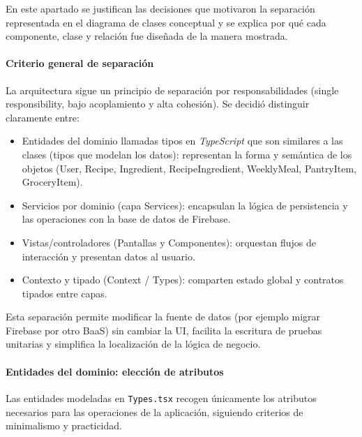 \documentclass[twoside, openright, 11pt]{report}
\begin{document}
		En este apartado se justifican las decisiones que motivaron la separación representada en el diagrama de clases conceptual y se explica por qué cada componente, clase y relación fue diseñada de la manera mostrada.
		
		\paragraph{Criterio general de separación}
		La arquitectura sigue un principio de separación por responsabilidades (single responsibility, bajo acoplamiento y alta cohesión). Se decidió distinguir claramente entre:
		\begin{itemize}
			\item Entidades del dominio llamadas tipos en \textit{TypeScript} que son similares a las clases (tipos que modelan los datos): representan la forma y semántica de los objetos (User, Recipe, Ingredient, RecipeIngredient, WeeklyMeal, PantryItem, GroceryItem).
			\item Servicios por dominio (capa Services): encapsulan la lógica de persistencia y las operaciones con la base de datos de Firebase.
			\item Vistas/controladores (Pantallas y Componentes): orquestan flujos de interacción y presentan datos al usuario.
			\item Contexto y tipado (Context / Types): comparten estado global y contratos tipados entre capas.
		\end{itemize}
		Esta separación permite modificar la fuente de datos (por ejemplo migrar Firebase por otro BaaS) sin cambiar la UI, facilita la escritura de pruebas unitarias y simplifica la localización de la lógica de negocio.
		
		\paragraph{Entidades del dominio: elección de atributos}
		Las entidades modeladas en \texttt{Types.tsx} recogen únicamente los atributos necesarios para las operaciones de la aplicación, siguiendo criterios de minimalismo y practicidad.
		
\end{document}

